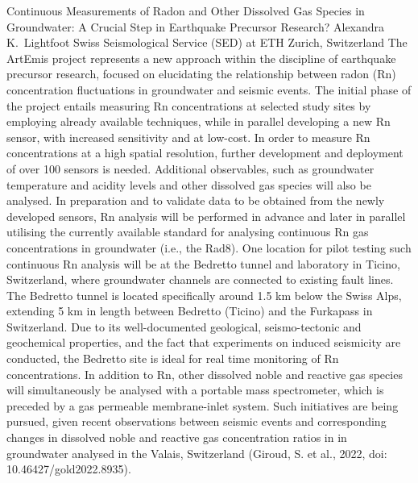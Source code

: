 \begin{conf-abstract}
{Continuous Measurements of Radon and Other Dissolved Gas Species in Groundwater: A Crucial Step in Earthquake Precursor Research?}
{Alexandra K.\ Lightfoot}
{Swiss Seismological Service (SED) at ETH Zurich, Switzerland}
{The ArtEmis project represents a new approach within the discipline of earthquake precursor research, focused on elucidating the relationship between radon (Rn) concentration fluctuations in groundwater and seismic events. The initial phase of the project entails measuring Rn concentrations at selected study sites by employing already available techniques, while in parallel developing a new Rn sensor, with increased sensitivity and at low-cost. In order to measure Rn concentrations at a high spatial resolution, further development and deployment of over 100 sensors is needed. Additional observables, such as groundwater temperature and acidity levels and other dissolved gas species will also be analysed. 
In preparation and to validate data to be obtained from the newly developed sensors, Rn analysis will be performed in advance and later in parallel utilising the currently available standard for analysing continuous Rn gas concentrations in groundwater (i.e., the Rad8). One location for pilot testing such continuous Rn analysis will be at the Bedretto tunnel and laboratory in Ticino, Switzerland, where groundwater channels are connected to existing fault lines. The Bedretto tunnel is located specifically around 1.5 km below the Swiss Alps, extending 5 km in length between Bedretto (Ticino) and the Furkapass in Switzerland. Due to its well-documented geological, seismo-tectonic and geochemical properties, and the fact that experiments on induced seismicity are conducted, the Bedretto site is ideal for real time monitoring of Rn concentrations. 
In addition to Rn, other dissolved noble and reactive gas species will simultaneously be analysed with a portable mass spectrometer, which is preceded by a gas permeable membrane-inlet system. Such initiatives are being pursued, given recent observations between seismic events and corresponding changes in dissolved noble and reactive gas concentration ratios in in groundwater analysed in the Valais, Switzerland (Giroud, S. et al., 2022, doi: 10.46427/gold2022.8935).}
\end{conf-abstract}
